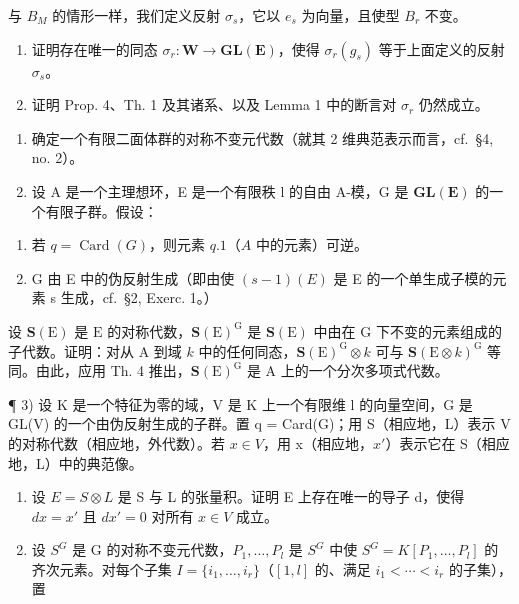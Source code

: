 与 \(B_{M}\) 的情形一样，我们定义反射 \(\sigma_{s}\)，它以 \(e_{s}\) 为向量，且使型 \(B_{r}\) 不变。

\begin{enumerate}
\def\labelenumi{\alph{enumi})}
\item
  证明存在唯一的同态 \(\sigma_r: \mathbf{W} \to \mathbf{GL}(\mathbf{E})\)，使得 \(\sigma_r(g_s)\) 等于上面定义的反射 \(\sigma_s\)。
\item
  证明 Prop. 4、Th. 1 及其诸系、以及 Lemma 1 中的断言对 \(\sigma_r\) 仍然成立。
\end{enumerate}


\begin{enumerate}
\def\labelenumi{\arabic{enumi})}
\item
  确定一个有限二面体群的对称不变元代数（就其 2 维典范表示而言，cf.~§4, no. 2）。
\item
  设 A 是一个主理想环，E 是一个有限秩 l 的自由 A-模，G 是 \(\mathbf{GL}(\mathbf{E})\) 的一个有限子群。假设：
\end{enumerate}

\begin{enumerate}
\def\labelenumi{(\roman{enumi})}
\item
  若 \(q = \operatorname{Card}(G)\)，则元素 \(q.1\)（\(A\) 中的元素）可逆。
\item
  G 由 E 中的伪反射生成（即由使 \((s - 1)(E)\) 是 E 的一个单生成子模的元素 s 生成，cf.~§2, Exerc. 1。）
\end{enumerate}

设 \(\mathbf{S}(\mathrm{E})\) 是 \(\mathrm{E}\) 的对称代数，\(\mathbf{S}(\mathrm{E})^{\mathrm{G}}\) 是 \(\mathbf{S}(\mathrm{E})\) 中由在 \(\mathrm{G}\) 下不变的元素组成的子代数。证明：对从 \(\mathrm{A}\) 到域 \(k\) 中的任何同态，\(\mathbf{S}(\mathrm{E})^{\mathrm{G}} \otimes k\) 可与 \(\mathbf{S}(\mathrm{E} \otimes k)^{\mathrm{G}}\) 等同。由此，应用 Th. 4 推出，\(\mathbf{S}(\mathrm{E})^{\mathrm{G}}\) 是 \(\mathrm{A}\) 上的一个分次多项式代数。

¶ 3) 设 K 是一个特征为零的域，V 是 K 上一个有限维 l 的向量空间，G 是 GL(V) 的一个由伪反射生成的子群。置 q = Card(G)；用 S（相应地，L）表示 V 的对称代数（相应地，外代数）。若 \(x \in V\)，用 x（相应地，\(x'\)）表示它在 S（相应地，L）中的典范像。

\begin{enumerate}
\def\labelenumi{\alph{enumi})}
\item
  设 \(E = S \otimes L\) 是 S 与 L 的张量积。证明 E 上存在唯一的导子 d，使得 \(dx = x'\) 且 \(dx' = 0\) 对所有 \(x \in V\) 成立。
\item
  设 \(S^{G}\) 是 G 的对称不变元代数，\(P_{1},\ldots,P_{l}\) 是 \(S^{G}\) 中使 \(S^{G}=K[P_{1},\ldots,P_{l}]\) 的齐次元素。对每个子集 \(I=\{i_{1},\ldots,i_{r}\}\)（\([1,l]\) 的、满足 \(i_{1}<\cdots<i_{r}\) 的子集），置
\end{enumerate}

